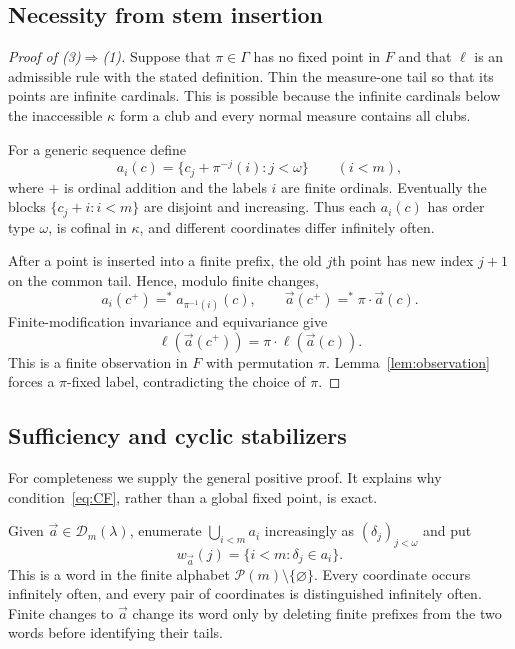 \documentclass[11pt,letterpaper]{article}
\theoremstyle{definition}
\numberwithin{equation}{section}
\newcommand{\Pow}{\mathcal P}
\begin{document}
\subsection{Necessity from stem insertion}
\begin{proof}[Proof of (3)$\Rightarrow$(1)]
Suppose that $\pi\in\Gamma$ has no fixed point in $F$ and that $\ell$ is an admissible rule with the stated definition. Thin the measure-one tail so that its points are infinite cardinals. This is possible because the infinite cardinals below the inaccessible $\kappa$ form a club and every normal measure contains all clubs.

For a generic sequence define
\begin{equation}\label{eq:twist}
a_i(c)=\{c_j+\pi^{-j}(i):j<\omega\}\qquad(i<m),
\end{equation}
where $+$ is ordinal addition and the labels $i$ are finite ordinals. Eventually the blocks $\{c_j+i:i<m\}$ are disjoint and increasing. Thus each $a_i(c)$ has order type $\omega$, is cofinal in $\kappa$, and different coordinates differ infinitely often.

After a point is inserted into a finite prefix, the old $j$th point has new index $j+1$ on the common tail. Hence, modulo finite changes,
\[
a_i(c^+)=^*a_{\pi^{-1}(i)}(c),\qquad
\vec a(c^+)=^*\pi\cdot\vec a(c).
\]
Finite-modification invariance and equivariance give
\[
\ell(\vec a(c^+))=\pi\cdot\ell(\vec a(c)).
\]
This is a finite observation in $F$ with permutation $\pi$. Lemma~\ref{lem:observation} forces a $\pi$-fixed label, contradicting the choice of $\pi$.
\end{proof}

\subsection{Sufficiency and cyclic stabilizers}

For completeness we supply the general positive proof. It explains why condition~\eqref{eq:CF}, rather than a global fixed point, is exact.

Given $\vec a\in\mathcal D_m(\lambda)$, enumerate $\bigcup_{i<m}a_i$ increasingly as $(\delta_j)_{j<\omega}$ and put
\[
w_{\vec a}(j)=\{i<m:\delta_j\in a_i\}.
\]
This is a word in the finite alphabet $\Pow(m)\setminus\{\varnothing\}$. Every coordinate occurs infinitely often, and every pair of coordinates is distinguished infinitely often. Finite changes to $\vec a$ change its word only by deleting finite prefixes from the two words before identifying their tails.
\end{document}
